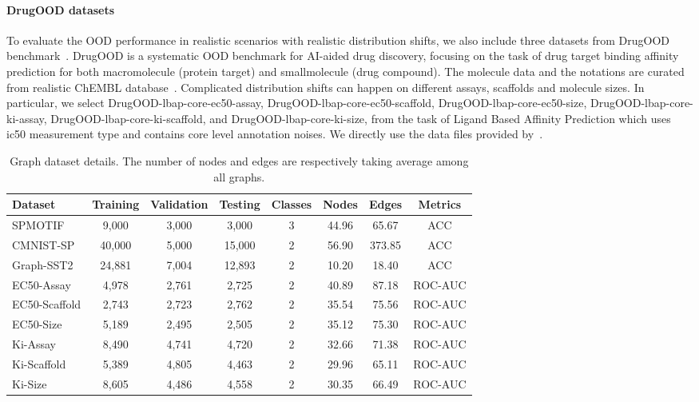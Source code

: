 \paragraph{DrugOOD datasets}To evaluate the OOD performance in realistic scenarios with realistic
distribution shifts, we also include three datasets from DrugOOD benchmark~\citep{drugood}. 
DrugOOD is a systematic OOD benchmark for AI-aided drug discovery, focusing on the task
of drug target binding affinity prediction for both macromolecule (protein target) and smallmolecule (drug compound). 
The molecule data and the notations are curated from realistic ChEMBL database~\citep{chembl}. Complicated distribution shifts can happen on different assays, scaffolds and molecule sizes. 
In particular, we select DrugOOD-lbap-core-ec50-assay,
DrugOOD-lbap-core-ec50-scaffold, DrugOOD-lbap-core-ec50-size,
DrugOOD-lbap-core-ki-assay, DrugOOD-lbap-core-ki-scaffold, and
DrugOOD-lbap-core-ki-size, from the task of Ligand Based Affinity Prediction which
uses ic50 measurement type and contains core level annotation noises. 
We directly use the data
files provided by~\cite{drugood}. 

\begin{table}[ht]
\centering
\caption{Graph dataset details. The number of nodes and edges are respectively taking average among all graphs.}
\label{tab: app_graph_data}
\begin{tabular}{l *{7}{c}}
\toprule
Dataset & Training & Validation & Testing & Classes & Nodes & Edges & Metrics \\
\midrule
SPMOTIF & 9,000 & 3,000 & 3,000 & 3 & 44.96 & 65.67 & ACC \\
CMNIST-SP & 40,000 & 5,000 & 15,000 & 2 & 56.90 & 373.85 & ACC \\
Graph-SST2 & 24,881 & 7,004 & 12,893 & 2 & 10.20 & 18.40 & ACC \\
EC50-Assay & 4,978 & 2,761 & 2,725 & 2 & 40.89 & 87.18 & ROC-AUC \\
EC50-Scaffold & 2,743 & 2,723 & 2,762 & 2 & 35.54 & 75.56 & ROC-AUC \\
EC50-Size & 5,189 & 2,495 & 2,505 & 2 & 35.12 & 75.30 & ROC-AUC \\
Ki-Assay & 8,490 & 4,741 & 4,720 & 2 & 32.66 & 71.38 & ROC-AUC \\
Ki-Scaffold & 5,389 & 4,805 & 4,463 & 2 & 29.96 & 65.11 & ROC-AUC \\
Ki-Size & 8,605 & 4,486 & 4,558 & 2 & 30.35 & 66.49 & ROC-AUC \\
\bottomrule
\end{tabular}
\end{table}


